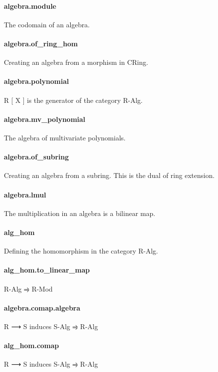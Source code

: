 \documentclass{article}
\begin{document}
\paragraph{algebra.module}
\par
The codomain of an algebra.
\paragraph{algebra.of\_ring\_hom}
\par
Creating an algebra from a morphism in CRing.
\paragraph{algebra.polynomial}
\par
R
{[}
X
{]}
 is the generator of the category R-Alg.
\paragraph{algebra.mv\_polynomial}
\par
The algebra of multivariate polynomials.
\paragraph{algebra.of\_subring}
\par
Creating an algebra from a subring. This is the dual of ring extension.
\paragraph{algebra.lmul}
\par
The multiplication in an algebra is a bilinear map.
\paragraph{alg\_hom}
\par
Defining the homomorphism in the category R-Alg.
\paragraph{alg\_hom.to\_linear\_map}
\par
R-Alg ⥤ R-Mod
\paragraph{algebra.comap.algebra}
\par
R ⟶ S induces S-Alg ⥤ R-Alg
\paragraph{alg\_hom.comap}
\par
R ⟶ S induces S-Alg ⥤ R-Alg
\end{document}

